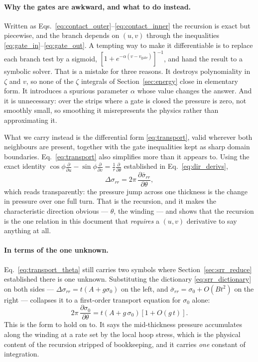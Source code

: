 \documentclass[11pt]{article}
\begin{document}
\paragraph{Why the gates are awkward, and what to do instead.} Written as
Eqs.~\eqref{eq:contact_outer}--\eqref{eq:contact_inner} the recursion is exact
but piecewise, and the branch depends on $(u,v)$ through the inequalities
\eqref{eq:gate_in}--\eqref{eq:gate_out}. A tempting way to make it differentiable
is to replace each branch test by a sigmoid,
$\left[1+e^{-\alpha\left(v - v_{\mathrm{gate}}\right)}\right]^{-1}$, and hand the
result to a symbolic solver. That is a mistake for three reasons. It destroys
polynomiality in $\zeta$ and $v$, so none of the $\zeta$ integrals of
Section~\ref{sec:energy} close in elementary form. It introduces a spurious
parameter $\alpha$ whose value changes the answer. And it is unnecessary: over
the strips where a gate is closed the pressure is zero, not smoothly small, so
smoothing it misrepresents the physics rather than approximating it.

What we carry instead is the differential form
\eqref{eq:transport}, valid wherever both neighbours are present, together with
the gate inequalities kept as sharp domain boundaries. Eq.~\eqref{eq:transport}
also simplifies more than it appears to. Using the exact identity
$\cos\phi\frac{\partial}{\partial u} - \sin\phi\frac{\partial}{\partial v}
= \frac{1}{r}\frac{\partial}{\partial \theta}$ established in
Eq.~\eqref{eq:dir_derivs},
\begin{equation}\label{eq:transport_theta}
    \boxed{\;\Delta\sigma_{rr}
      = 2\pi\,\frac{\partial \bar\sigma_{rr}}{\partial \theta},\;}
\end{equation}
which reads transparently: the pressure jump across one thickness is the change
in pressure over one full turn. That is the recursion, and it makes the
characteristic direction obvious --- $\theta$, the winding --- and shows that the
recursion is the one relation in this document that \emph{requires} a
$(u,v)$ derivative to say anything at all.

\paragraph{In terms of the one unknown.} Eq.~\eqref{eq:transport_theta} still
carries two symbols where Section~\ref{sec:srr_reduce} established there is one
unknown. Substituting the dictionary \eqref{eq:srr_dictionary} on both sides ---
$\Delta\sigma_{rr} = t\left(A+g\sigma_{0}\right)$ on the left, and
$\bar\sigma_{rr} = \sigma_{0} + O\!\left(Bt^{2}\right)$ on the right --- collapses
it to a first-order transport equation for $\sigma_{0}$ alone:
\begin{equation}\label{eq:s0_transport}
    \boxed{\;2\pi\,\frac{\partial \sigma_{0}}{\partial \theta}
      = t\left(A + g\,\sigma_{0}\right)
      \left[1 + O\!\left(g\,t\right)\right].\;}
\end{equation}
This is the form to hold on to. It says the mid-thickness pressure accumulates
along the winding at a rate set by the local hoop stress, which is the physical
content of the recursion stripped of bookkeeping, and it carries \emph{one}
constant of integration.
\end{document}
